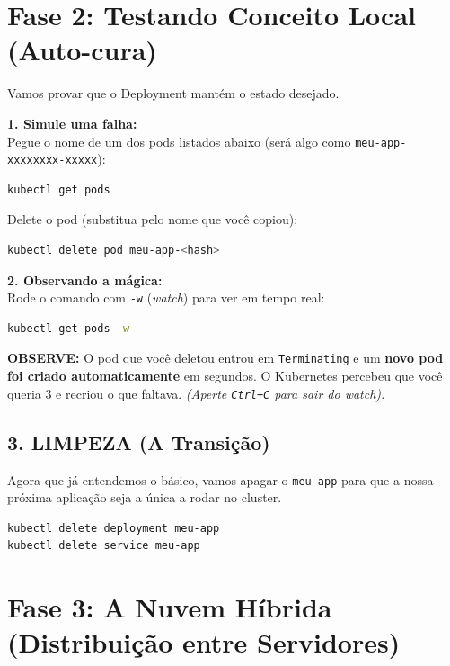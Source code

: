\documentclass[11pt, a4paper]{article}
\begin{document}
\section*{Fase 2: Testando Conceito Local (Auto-cura)}

Vamos provar que o Deployment mantém o estado desejado.

\textbf{1. Simule uma falha:} \\
Pegue o nome de um dos pods listados abaixo (será algo como \texttt{meu-app-xxxxxxxx-xxxxx}):

\begin{lstlisting}[language=bash]
kubectl get pods
\end{lstlisting}

Delete o pod (substitua pelo nome que você copiou):

\begin{lstlisting}[language=bash]
kubectl delete pod meu-app-<hash>
\end{lstlisting}

\textbf{2. Observando a mágica:} \\
Rode o comando com \texttt{-w} (\textit{watch}) para ver em tempo real:

\begin{lstlisting}[language=bash]
kubectl get pods -w
\end{lstlisting}

\begin{tcolorbox}[colback=infobg, colframe=infoframe, arc=3pt, boxrule=0.8pt]
\textbf{OBSERVE:} O pod que você deletou entrou em \texttt{Terminating} e um \textbf{novo pod foi criado automaticamente} em segundos. O Kubernetes percebeu que você queria 3 e recriou o que faltava. \textit{(Aperte \texttt{Ctrl+C} para sair do watch).}
\end{tcolorbox}

\subsection*{3. LIMPEZA (A Transição)}
Agora que já entendemos o básico, vamos apagar o \texttt{meu-app} para que a nossa próxima aplicação seja a única a rodar no cluster.

\begin{lstlisting}[language=bash]
kubectl delete deployment meu-app
kubectl delete service meu-app
\end{lstlisting}

\section*{Fase 3: A Nuvem Híbrida (Distribuição entre Servidores)}
\end{document}
